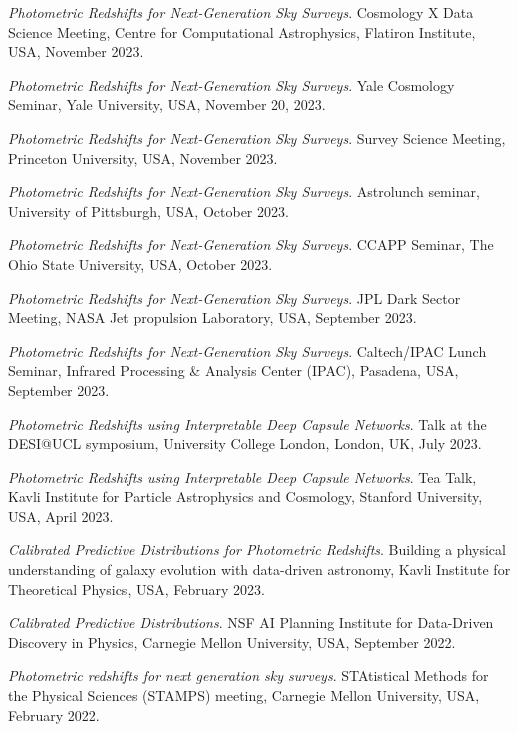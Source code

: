 
 \begin{etaremune}[leftmargin=40pt,labelsep=10pt]
    \item \textit{Photometric Redshifts for Next-Generation Sky Surveys}. Cosmology X Data Science Meeting, Centre for Computational Astrophysics, Flatiron Institute, USA, November 2023.
    \item \textit{Photometric Redshifts for Next-Generation Sky Surveys}. Yale Cosmology Seminar, Yale University, USA, November 20, 2023.
    \item \textit{Photometric Redshifts for Next-Generation Sky Surveys}. Survey Science Meeting, Princeton University, USA, November 2023.
    \item \textit{Photometric Redshifts for Next-Generation Sky Surveys}. Astrolunch seminar, University of Pittsburgh, USA, October 2023.
    \item \textit{Photometric Redshifts for Next-Generation Sky Surveys}. CCAPP Seminar, The Ohio State University, USA, October 2023.
    \item \textit{Photometric Redshifts for Next-Generation Sky Surveys}. JPL Dark Sector Meeting, NASA Jet propulsion Laboratory, USA, September 2023.
    \item \textit{Photometric Redshifts for Next-Generation Sky Surveys}. Caltech/IPAC Lunch Seminar, Infrared Processing \& Analysis Center (IPAC), Pasadena, USA, September 2023.
    \item \textit{Photometric Redshifts using Interpretable Deep Capsule Networks}. Talk at the DESI@UCL symposium, University College London, London, UK, July 2023.
    \item \textit{Photometric Redshifts using Interpretable Deep Capsule Networks}. Tea Talk, Kavli Institute for Particle Astrophysics and Cosmology, Stanford University, USA, April 2023.
    \item \textit{Calibrated Predictive Distributions for Photometric Redshifts}. Building a physical understanding of galaxy evolution with data-driven astronomy, Kavli Institute for Theoretical Physics, USA, February 2023.
    \item \textit{Calibrated Predictive Distributions}. NSF AI Planning Institute for Data-Driven Discovery in Physics, Carnegie Mellon University, USA, September 2022.
 
    \item \textit{Photometric redshifts for next generation sky surveys}. STAtistical Methods for the Physical Sciences (STAMPS) meeting, Carnegie Mellon University, USA, February 2022.
 

\end{etaremune}
